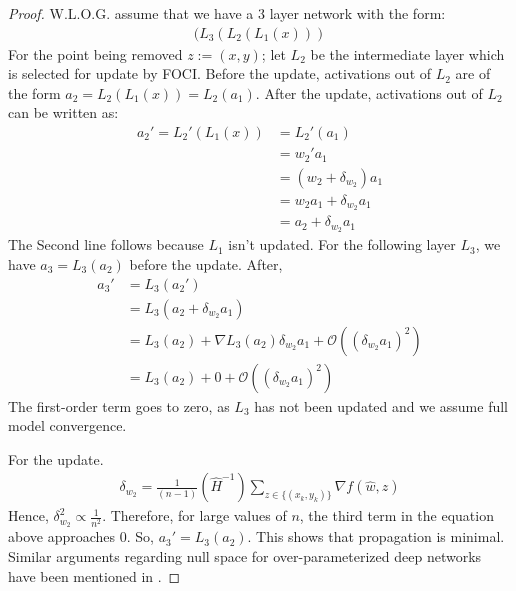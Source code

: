 \begin{proof}
W.L.O.G. assume that we have a $3$ layer network with the form:
\begin{align}
    (L_3(L_2(L_1(x)))
\end{align}
For the point being removed $z := (x,y)$; let $L_2$ be the intermediate layer which is selected for update by FOCI.
Before the update, activations out of $L_2$ are of the form $a_2 = L_2(L_1(x)) = L_2(a_1)$.
After the update, activations out of $L_2$ can be written as:
\begin{align}
    a_2' = L_2'(L_1(x)) &= L_2'(a_1) \\
    & = w_2' a_1 \\
    & = (w_2 + \delta_{w_2}) a_1 \\
    & = w_2 a_1 + \delta_{w_2} a_1 \\
    & = a_2 + \delta_{w_2} a_1
\end{align}
The Second line follows because $L_1$ isn't updated.
For the following layer $L_3$, we have $a_3 = L_3(a_2)$ before the update. After,
\begin{align}
    a_3' &= L_3(a_2') \\
    &= L_3(a_2 + \delta_{w_2} a_1) \\
    &= L_3(a_2) + \nabla L_3 (a_2) \delta_{w_2} a_1 + \mathcal{O}((\delta_{w_2} a_1)^2) \\
    &= L_3(a_2) + 0 + \mathcal{O}((\delta_{w_2} a_1)^2) 
\end{align}
The first-order term goes to zero, as $L_3$ has not been updated and we assume full model convergence.

For the \cite{sekhari2021remember} update.
\begin{align}
    \delta_{w_2} = \frac{1}{(n-1)}(\hat{H}^{-1})\sum_{z \in \{(x_k, y_k)\}} \nabla f(\hat{w}, z)
\end{align}
Hence, $\delta_{w_2}^2 \propto \frac{1}{n^2}$. Therefore, for large values of $n$, the third term in the equation above approaches $0$. So, $a_3' = L_3(a_2)$. This shows that propagation is minimal. Similar arguments regarding null space for over-parameterized deep networks have been mentioned in \cite{golatkar2020forgetting}. 


\end{proof}
